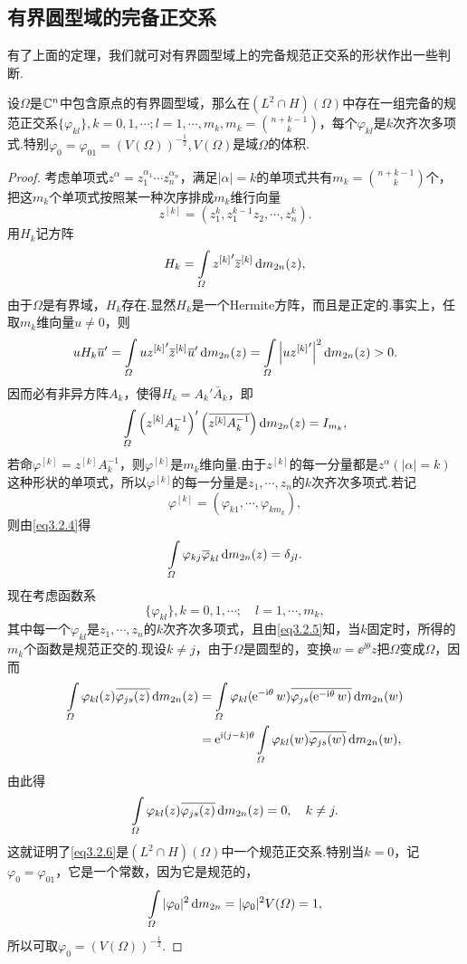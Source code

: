 \subsection{有界圆型域的完备正交系}
有了上面的定理，我们就可对有界圆型域上的完备规范正交系的形状作出一些判断.
\begin{theorem}\label{thm3.2.2}
	设$\Omega$是$\mathbb C^n$中包含原点的有界圆型域，那么在$(L^2\cap H)(\Omega)$中存在一组完备的规范正交系$\{\varphi_{kl}\},k=0,1,\cdots;l=1,\cdots,m_k,m_k=\binom{n+k-1}{k}$，每个$\varphi_{kl}$是$k$次齐次多项式.特别$\varphi_0=\varphi_{01}=\left(V(\Omega)\right)^{-\frac12},V(\Omega)$是域$\Omega$的体积.
\end{theorem}
\begin{proof}
	考虑单项式$z^\alpha=z_1^{\alpha_1}\cdots z_n^{\alpha_n}$，满足$|\alpha|=k$的单项式共有$m_k=\binom{n+k-1}{k}$个，把这$m_k$个单项式按照某一种次序排成$m_k$维行向量
	\[z^{[k]}=(z_1^k,z_1^{k-1}z_2,\cdots,z_n^k).\]
	用$H_k$记方阵
	\[H_k=\int\limits_\varOmega {z^{[k]}}'{}\mkern1mu\overline{\mkern-1muz}^{[k]}\mathop{}\!\mathrm{d} m_{2n}(z),\]
	由于$\Omega$是有界域，$H_k$存在.显然$H_k$是一个Hermite方阵，而且是正定的.事实上，任取$m_k$维向量$u\neq0$，则
	\[uH_k{{}\mkern1mu\overline{\mkern-1muu}}'=\int\limits_\varOmega {uz^{[k]}}' {}\mkern1mu\overline{\mkern-1muz}^{[k]} {{}\mkern1mu\overline{\mkern-1muu}}'\mathop{}\!\mathrm{d} m_{2n}(z)=\int\limits_\varOmega\left|{uz^{[k]}}'\right|^2\mathop{}\!\mathrm{d} m_{2n}(z)>0.\]
	因而必有非异方阵$A_k$，使得$H_k=A_k'\bar{A}_k$，即
	\begin{equation}\label{eq3.2.4}
		\int\limits_\varOmega\left(z^{[k]}A_k^{-1}\right)'\left({}\mkern1mu\overline{\mkern-1muz^{[k]}A_k^{-1}}\right)\mathop{}\!\mathrm{d} m_{2n}(z)=I_{m_k},
	\end{equation}
若命$\varphi^{[k]}=z^{[k]}A_k^{-1}$，则$\varphi^{[k]}$是$m_k$维向量.由于$z^{[k]}$的每一分量都是$z^\alpha(|\alpha|=k)$这种形状的单项式，所以$\varphi^{[k]}$的每一分量是$z_1,\cdots,z_n$的$k$次齐次多项式.若记
\[\varphi^{[k]}=(\varphi_{k1},\cdots,\varphi_{km_k}),\]
则由\eqref{eq3.2.4}得
\begin{equation}\label{eq3.2.5}
	\int\limits_\varOmega \varphi_{kj}{}\mkern1mu\overline{\mkern-1mu\varphi}_{kl}\mathop{}\!\mathrm{d} m_{2n}(z)=\delta_{jl}.
\end{equation}
现在考虑函数系
\begin{equation}\label{eq3.2.6}
	\{\varphi_{kl}\},k=0,1,\cdots;\quad l=1,\cdots,m_k,
\end{equation}
其中每一个$\varphi_{kl}$是$z_1,\cdots,z_n$的$k$次齐次多项式，且由\eqref{eq3.2.5}知，当$k$固定时，所得的$m_k$个函数是规范正交的.现设$k\neq j$，由于$\Omega$是圆型的，变换$w=\ee^{\ii\theta}z$把$\Omega$变成$\Omega$，因而
\begin{align*}
	\int\limits_\Omega \varphi_{kl}(z)\bar{\varphi_{js}(z)}\dif m_{2n}(z)
	&=\int\limits_\Omega \varphi_{kl}(\ee^{-\ii\theta}w)\bar{\varphi_{js}(\ee^{-\ii\theta}w)}\dif m_{2n}(w)\\
	&=\ee^{\ii(j-k)\theta}\int\limits_\Omega\varphi_{kl}(w)\bar{\varphi_{js}(w)}\dif m_{2n}(w),
\end{align*}
由此得
\[\int\limits_\varOmega \varphi_{kl}(z){}\mkern1mu\overline{\mkern-1mu\varphi_{js}(z)}\mathop{}\!\mathrm{d} m_{2n}(z)=0,\quad k\neq j.\]
这就证明了\eqref{eq3.2.6}是$(L^2\cap H)(\Omega)$中一个规范正交系.特别当$k=0$，记$\varphi_0=\varphi_{01}$，它是一个常数，因为它是规范的，
\[\int\limits_\varOmega|\varphi_0|^2\mathop{}\!\mathrm{d} m_{2n}=|\varphi_0|^2 V(\varOmega)=1,\]
所以可取$\varphi_0=\left(V(\Omega)\right)^{-\frac12}$.


\end{proof}
